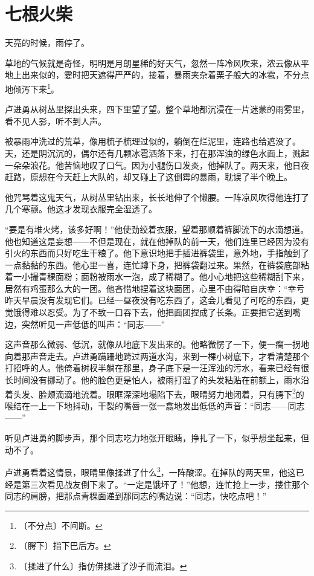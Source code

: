 \documentclass[12pt,UTF-8,openany]{ctexbook}
\begin{document}
\chapter{七根火柴}

\begin{normalsize}
    
    天亮的时候，雨停了。
    
    草地的气候就是奇怪，明明是月朗星稀的好天气，忽然一阵冷风吹来，浓云像从平地上出来似的，霎时把天遮得严严的，接着，暴雨夹杂着栗子般大的冰雹，不分点地倾泻下来\footnote{〔不分点〕不间断。}。
    
    卢进勇从树丛里探出头来，四下里望了望。整个草地都沉浸在一片迷蒙的雨雾里，看不见人影，听不到人声。
    
    被暴雨冲洗过的荒草，像用梳子梳理过似的，躺倒在烂泥里，连路也给遮没了。天，还是阴沉沉的，偶尔还有几颗冰雹洒落下来，打在那浑浊的绿色水面上，溅起一朵朵浪花。他苦恼地叹了口气。因为小腿伤口发炎，他掉队了。两天来，他日夜赶路，原想在今天赶上大队的，却又碰上了这倒霉的暴雨，耽误了半个晚上。
    
    他咒骂着这鬼天气，从树丛里钻出来，长长地伸了个懒腰。一阵凉风吹得他连打了几个寒颤。他这才发现衣服完全湿透了。
    
    “要是有堆火烤，该多好啊！”他使劲绞着衣服，望着那顺着裤脚流下的水滴想道。他也知道这是妄想——不但是现在，就在他掉队的前一天，他们连里已经因为没有引火的东西而只好吃生干粮了。他下意识地把手插进裤袋里，意外地，手指触到了一点黏黏的东西。他心里一喜，连忙蹲下身，把裤袋翻过来。果然，在裤袋底部粘着一小撮青稞面粉；面粉被雨水一泡，成了稀糊了。他小心地把这些稀糊刮下来，居然有鸡蛋那么大的一团。他吝惜地捏着这块面团，心里不由得暗自庆幸：“幸亏昨天早晨没有发现它们。已经一昼夜没有吃东西了，这会儿看见了可吃的东西，更觉饿得难以忍受。为了不致一口吞下去，他把面团捏成了长条。正要把它送到嘴边，突然听见一声低低的叫声：“同志——”
    
    这声音那么微弱、低沉，就像从地底下发出来的。他略微愣了一下，便一瘸一拐地向着那声音走去。卢进勇蹒跚地跨过两道水沟，来到一棵小树底下，才看清楚那个打招呼的人。他倚着树杈半躺在那里，身子底下是一汪浑浊的污水，看来已经有很长时间没有挪动了。他的脸色更是怕人，被雨打湿了的头发粘贴在前额上，雨水沿着头发、脸颊滴滴地流着。眼眶深深地塌陷下去，眼睛努力地闭着，只有腭下\footnote{〔腭下〕指下巴后方。}的喉结在一上一下地抖动，干裂的嘴唇一张一翕地发出低低的声音：“同志——同志——”
    
    听见卢进勇的脚步声，那个同志吃力地张开眼睛，挣扎了一下，似乎想坐起来，但动不了。
    
    卢进勇看着这情景，眼睛里像揉进了什么\footnote{〔揉进了什么〕指仿佛揉进了沙子而流泪。}，一阵酸涩。在掉队的两天里，他这已经是第三次看见战友倒下来了。“一定是饿坏了！”他想，连忙抢上一步，搂住那个同志的肩膀，把那点青稞面递到那同志的嘴边说：“同志，快吃点吧！”
    

\end{normalsize}
\end{document}
